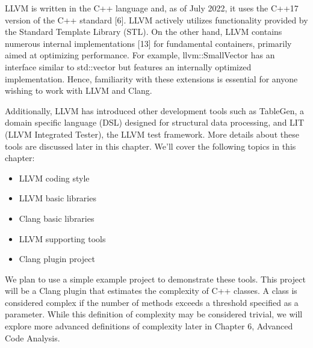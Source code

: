 LLVM is written in the C++ language and, as of July 2022, it uses the C++17 version of the C++ standard [6]. LLVM actively utilizes functionality provided by the Standard Template Library (STL). On the other hand, LLVM contains numerous internal implementations [13] for fundamental containers, primarily aimed at optimizing performance. For example, llvm::SmallVector has an interface similar to std::vector but features an internally optimized implementation. Hence, familiarity with these extensions is essential for anyone wishing to work with LLVM and Clang.

Additionally, LLVM has introduced other development tools such as TableGen, a domain specific language (DSL) designed for structural data processing, and LIT (LLVM Integrated Tester), the LLVM test framework. More details about these tools are discussed later in this chapter. We’ll cover the following topics in this chapter:

\begin{itemize}
\item
LLVM coding style

\item
LLVM basic libraries

\item
Clang basic libraries

\item
LLVM supporting tools

\item
Clang plugin project
\end{itemize}

We plan to use a simple example project to demonstrate these tools. This project will be a Clang plugin that estimates the complexity of C++ classes. A class is considered complex if the number of methods exceeds a threshold specified as a parameter. While this definition of complexity may be considered trivial, we will explore more advanced definitions of complexity later in Chapter 6, Advanced Code Analysis.
